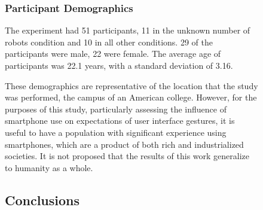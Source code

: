 \begin{subfigure}{0.48\textwidth}



\subsubsection{Participant Demographics}

The experiment had 51 participants, 11 in the unknown number of robots condition and 10 in all other conditions. 29 of the participants were male, 22 were female. The average age of participants was 22.1 years, with a standard deviation of 3.16. 

These demographics are representative of the location that the study was performed, the campus of an American college. 
However, for the purposes of this study, particularly assessing the influence of smartphone use on expectations of user interface gestures, it is useful to have a population with significant experience using smartphones, which are a product of both rich and industrialized societies. 
It is not proposed that the results of this work generalize to humanity as a whole.  

\subsection{Conclusions}


\end{subfigure}

